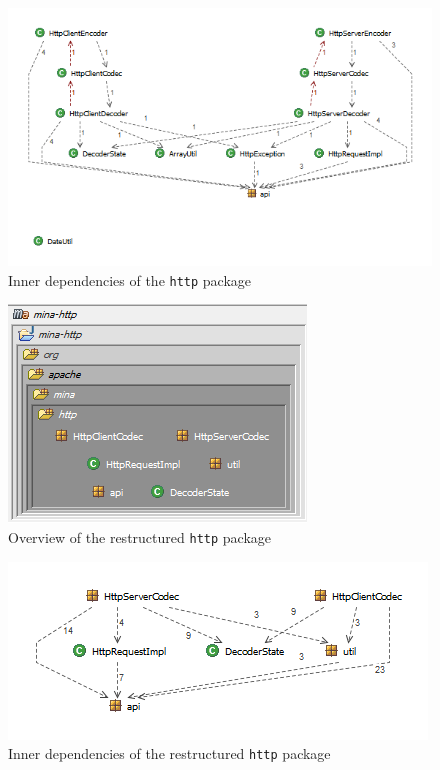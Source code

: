 \begin{figure}[H]
    \centering
    \includegraphics[width=\textwidth]{images/MINA_http_dependencies_initial.png}
    \caption{Inner dependencies of the \texttt{http} package}
    \label{fig:http_dependencies_initial}
\end{figure}

\begin{figure}[H]
    \centering
    \includegraphics{images/MINA_http_structure.png}
    \caption{Overview of the restructured \texttt{http} package}
    \label{fig:http_structure_restructured}
\end{figure}

\begin{figure}[H]
    \centering
    \includegraphics{images/MINA_http_dependencies.png}
    \caption{Inner dependencies of the restructured \texttt{http} package}
    \label{fig:http_dependencies_restructured}
\end{figure}

